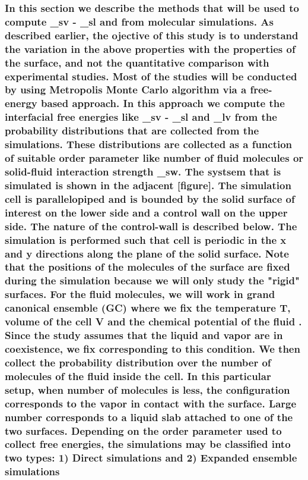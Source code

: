 \documentclass[a4paper,12pt,single,pdftex]{scrartcl}
\begin{document}
{\label{ID_1874909901}\subsubsection{In this section we describe the methods that will be used to compute \gamma_{sv} - \gamma_{sl} and  from molecular simulations. As described earlier, the ojective of this study is to understand the variation in the above properties with the properties of the surface, and not the quantitative comparison with experimental studies. Most of the studies will be conducted by using Metropolis Monte Carlo algorithm via a free-energy based approach. In this approach we compute the interfacial free energies like \gamma_{sv} - \gamma_{sl} and \gamma_{lv} from the probability distributions that are collected from the simulations. These distributions are collected as a function of suitable order parameter like number of fluid molecules or solid-fluid interaction strength \epsilon_{sw}. The systsem that is simulated is shown in the adjacent [figure]. The simulation cell is parallelopiped and is bounded by the solid surface of interest on the lower side and a control wall on the upper side. The nature of the control-wall is described below. The simulation is performed such that  cell is periodic in the x and y directions along the plane of the solid surface. Note that the positions of the molecules of the surface are fixed during the simulation because we will only study the "rigid" surfaces.  For the fluid molecules, we will work in grand canonical ensemble (GC) where we fix the temperature T, volume of the cell V and the chemical potential of the fluid \mu. Since the study assumes that the liquid and vapor are in coexistence, we fix \mu corresponding to this condition. We then collect the probability distribution over the number of molecules of the fluid inside the cell. In this particular setup, when number of molecules is less, the configuration corresponds to the vapor in contact with the surface. Large number corresponds to a liquid slab attached to one of the two surfaces. Depending on the order parameter used to collect free energies, the simulations may be classified into two types: 1) Direct simulations and 2) Expanded ensemble simulations}

}
\end{document}
